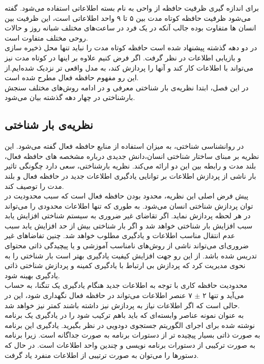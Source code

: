 برای اندازه گیری ظرفیت حافظه از واحی به نام بسته اطلاعاتی
استفاده می‌شود.
گفته می‌شود ظرفیت حافظه کوتاه مدت بین ۵ تا ۹ واحد اطلاعاتی است، این ظرفیت بین انسان ها متفاوت بوده جالب آنکه در یک فرد در ساعت‌های مختلف شبانه روز و حالات روحی مختلف متفاوت است.
\\
در دو دهه گذشته پیشنهاد شده است حافظه کوتاه مدت را نباید تنها محل ذخیره سازی و بازیابی اطلاعات در نظر گرفت. اگر فرض کنیم علاوه بر اینها در کوتاه مدت نیز می‌تواند با اطلاعات کار کند و آنها را پردازش کند، به مدل واقعی تر نزدیک شده‌ایم.از این رو مفهوم حافظه فعال
مطرح شده است.
\\
در این فصل، ابتدا نظریه‌ی بار شناختی معرفی و در ادامه روش‌های مختلف سنجش بارشناختی در چهار دهه گذشته بیان می‌شود.
\cite{sweller2011measuring}

\subsection{نظریه‌ی بار شناختی}
در روانشناسی شناختی، به میزان استفاده از منابع حافظه فعال گفته می‌شود. این نظریه بر مبنای ساختار شناختی انسان،‌دانش جدیدی درباره مشخصه های حافظه فعال، بلند مدت و رابطه بین این دو ارائه می‌کند.
\cite{sweller2019cognitive}
نظریه بارشناختی، سعی دارد چگونگی تاثیر بار ناشی از پردازش اطلاعات بر توانایی یادگیری اطلاعات جدید در حافظه فعال و بلند مدت را توصیف کند.
\\
پیش فرض اصلی این نظریه، محدود بودن حافظه فعال است که سبب محدودیت در توان پردازش شناختی انسان می‌شود. به طوری که تنها اطلاعات محدودی را می‌تواند در هر لحظه پردازش نماید. اگر تقاضای غیر ضروری به سیستم شناختی افزایش یابد سبب افزایش بار شناختی خواهد شد و اگر بار شناختی بیش از حد افزایش یابد سبب عدم انتقال مناسب اطلاعات و یادگیری مطلوب خواهد شد. چنین تفاضاهای غیر ضروری‌ای می‌تواند ناشی از روش‌های نامناسب آموزشی و یا پیچیدگی ذاتی محتوای تدریس شده باشد. از این رو جهت افزایش کیفیت یادگیری بهتر است بار شناختی را به نحوی مدیریت کرد که پردازش بی ارتباط با یادگیری کمینه و پردازش شناختی ذاتی یادگیری بهینه شود.
\cite{sweller2019cognitive}
\\
محدودیت حافظه کاری با توجه به اطلاعات جدید هنگام یادگیری یک تنگنا، به حساب می‌آید و تنها ۲
$\pm$
۷
عنصر اطلاعات می‌تواند در حافظه فعال نگهداری شود، این در حالی است که اگر اطلاعات نیاز به پردازش نیز داشته باشند کمتر نیز خواهد شد.
\\
به عنوان نمونه عناصر وابسته‌ای که باید باهم ترکیب شود را در یادگیری یک برنامه نوشته شده برای اجرای الگوریتم جستجوی دودویی در نظر بگیرید. یادگیری این برنامه به صورت ذاتی بسیار پیچیده تر از دستورات برنامه به صورت جداگانه است. زیرا برنامه به صورت ترکیبی از دستورات برنامه نویسی و چندین واحد اطلاعات است. در حال که دستورها را می‌توان به صورت ترتیبی از اطلاعات منفرد یاد گرفت. 
